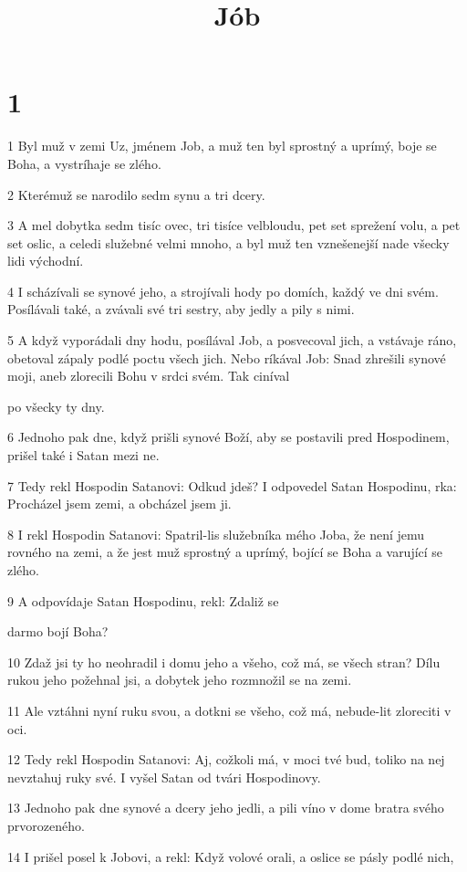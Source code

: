 

\title{Jób}

\chapter{1}

\par 1 Byl muž v zemi Uz, jménem Job, a muž ten byl sprostný a uprímý, boje se Boha, a vystríhaje se zlého.
\par 2 Kterémuž se narodilo sedm synu a tri dcery.
\par 3 A mel dobytka sedm tisíc ovec, tri tisíce velbloudu, pet set sprežení volu, a pet set oslic, a celedi služebné velmi mnoho, a byl muž ten vznešenejší nade všecky lidi východní.
\par 4 I scházívali se synové jeho, a strojívali hody po domích, každý ve dni svém. Posílávali také, a zvávali své tri sestry, aby jedly a pily s nimi.
\par 5 A když vyporádali dny hodu, posílával Job, a posvecoval jich, a vstávaje ráno, obetoval zápaly podlé poctu všech jich. Nebo ríkával Job: Snad zhrešili synové moji, aneb zlorecili Bohu v srdci svém. Tak ciníval \par po všecky ty dny.
\par 6 Jednoho pak dne, když prišli synové Boží, aby se postavili pred Hospodinem, prišel také i Satan mezi ne.
\par 7 Tedy rekl Hospodin Satanovi: Odkud jdeš? I odpovedel Satan Hospodinu, rka: Procházel jsem zemi, a obcházel jsem ji.
\par 8 I rekl Hospodin Satanovi: Spatril-lis služebníka mého Joba, že není jemu rovného na zemi, a že jest muž sprostný a uprímý, bojící se Boha a varující se zlého.
\par 9 A odpovídaje Satan Hospodinu, rekl: Zdaliž se \par darmo bojí Boha?
\par 10 Zdaž jsi ty ho neohradil i domu jeho a všeho, což má, se všech stran? Dílu rukou jeho požehnal jsi, a dobytek jeho rozmnožil se na zemi.
\par 11 Ale vztáhni nyní ruku svou, a dotkni se všeho, což má, nebude-lit zloreciti v oci.
\par 12 Tedy rekl Hospodin Satanovi: Aj, cožkoli má, v moci tvé bud, toliko na nej nevztahuj ruky své. I vyšel Satan od tvári Hospodinovy.
\par 13 Jednoho pak dne synové a dcery jeho jedli, a pili víno v dome bratra svého prvorozeného.
\par 14 I prišel posel k Jobovi, a rekl: Když volové orali, a oslice se pásly podlé nich,
